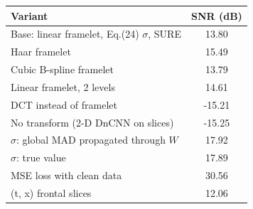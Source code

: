 \begin{tabular}{lc}
\hline
Variant & SNR (dB) \\
\hline
Base: linear framelet, Eq.(24) $\sigma$, SURE & 13.80 \\
Haar framelet & 15.49 \\
Cubic B-spline framelet & 13.79 \\
Linear framelet, 2 levels & 14.61 \\
DCT instead of framelet & -15.21 \\
No transform (2-D DnCNN on slices) & -15.25 \\
$\sigma$: global MAD propagated through $W$ & 17.92 \\
$\sigma$: true value & 17.89 \\
MSE loss with clean data & 30.56 \\
(t, x) frontal slices & 12.06 \\
\hline
\end{tabular}
